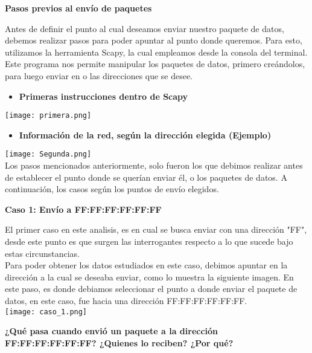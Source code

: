 \documentclass{article}
\begin{document}
\newpage
\begin{center}
{\LARGE \bfseries Pasos previos al envío de paquetes }
\end{center}
Antes de definir el punto al cual deseamos enviar nuestro paquete de datos, debemos realizar
pasos para poder apuntar al punto donde queremos. Para esto, utilizamos la herramienta Scapy, 
la cual empleamos desde la consola del terminal. Este programa nos permite manipular los paquetes de datos, primero creándolos, para luego enviar en o las direcciones que se desee.
\begin{itemize}
\item \textbf{Primeras instrucciones dentro de Scapy}
\end{itemize}
\texttt{[image: primera.png]}
\begin{itemize}
\item \textbf{Información de la red, según la dirección elegida (Ejemplo)}
\end{itemize}
\texttt{[image: Segunda.png]}
\\
Los pasos mencionados anteriormente, solo fueron los que debimos realizar antes de establecer el punto donde se querían enviar él, o los paquetes de datos. A continuación, los casos según los puntos de envío elegidos.  
\newpage
\begin{center}
{\LARGE \bfseries Caso 1: Envío a FF:FF:FF:FF:FF:FF}
\end{center}
El primer caso en este analisis, es en cual se busca enviar con una dirección "FF", desde este punto es que surgen las interrogantes respecto a lo que sucede bajo estas circunstancias.\\
Para poder obtener los datos estudiados en este caso, debimos apuntar en la dirección a la cual se deseaba enviar, como lo muestra la siguiente imagen. En este paso, es donde debiamos seleccionar el punto a donde enviar el paquete de datos, en este caso, fue hacia una dirección FF:FF:FF:FF:FF:FF.
\\
\texttt{[image: caso\_1.png]}


\textbf{¿Qué pasa cuando envió un paquete a la dirección FF:FF:FF:FF:FF:FF? ¿Quienes
lo reciben? ¿Por qué?}
\end{document}
